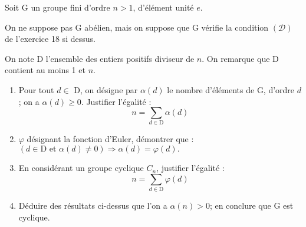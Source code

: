 
Soit G un groupe fini d'ordre $n>1$, d'élément unité $e$.

On ne suppose pas G abélien, mais on suppose que G vérifie la condition $(\mathcal{D})$ de l'exercice 18 si dessus.

On note D l'ensemble des entiers positifs diviseur de $n$. On remarque que D contient au moins 1 et $n$.

\begin{enumerate}[label=\alph*)]
    \item Pour tout $d \in $ D, on désigne par $\alpha(d)$ le nombre d'éléments de G, d'ordre $d$; on a $\alpha(d)\geq0$. Justifier l'égalité :
    \begin{equation}
        n = \sum_{d \in \text{D}} \alpha(d)
    \end{equation}
    \item $\varphi$ désignant la fonction d'Euler, démontrer que : $(d \in \text{D et } \alpha(d)\neq 0)\Rightarrow \alpha(d) = \varphi(d).$
    \item En considérant un groupe cyclique $C_n$, justifier l'égalité :
    \begin{equation}
        n = \sum_{d \in \text{D}} \varphi(d)
    \end{equation}
    \item Déduire des résultats ci-dessus que l'on a $\alpha(n)>0$; en conclure que G est cyclique.
\end{enumerate}